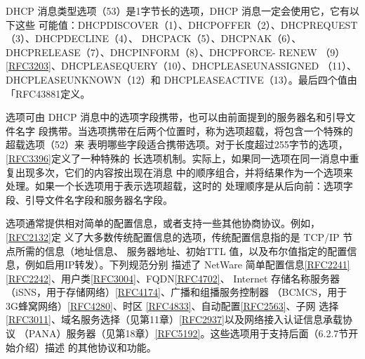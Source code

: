 DHCP 消息类型选项（53）是1字节长的选项，DHCP 消息一定会使用它，它有以下这些
可能值：DHCPDISCOVER（1）、DHCPOFFER（2）、DHCPREQUEST（3）、DHCPDECLINE（4）、
DHCPACK（5）、DHCPNAK（6）、DHCPRELEASE（7）、DHCPINFORM（8）、DHCPFORCE-
RENEW （9）\href{https://www.rfc-editor.org/rfc/rfc3203}{\href{https://www.rfc-editor.org/rfc/rfc3203}{[RFC3203]}}、DHCPLEASEQUERY（10）、DHCPLEASEUNASSIGNED （11）、
DHCPLEASEUNKNOWN（12）和 DHCPLEASEACTIVE（13）。最后四个值由「RFC43881定义。

选项可由 DHCP 消息中的选项字段携带，也可以由前面提到的服务器名和引导文件名字
段携带。当选项携带在后两个位置时，称为选项超载，将包含一个特殊的超载选项（52）来
表明哪些字段适合携带选项。对于长度超过255字节的选项，\href{https://www.rfc-editor.org/rfc/rfc3396}{\href{https://www.rfc-editor.org/rfc/rfc3396}{[RFC3396]}}定义了一种特殊的
长选项机制。实际上，如果同一选项在同一消息中重复出现多次，它们的内容按出现在消息
中的顺序组合，并将结果作为一个选项来处理。如果一个长选项用于表示选项超载，这时的
处理顺序是从后向前：选项字段、引导文件名字段和服务器名字段。

选项通常提供相对简单的配置信息，或者支持一些其他协商协议。例如，\href{https://www.rfc-editor.org/rfc/rfc2132}{\href{https://www.rfc-editor.org/rfc/rfc2132}{[RFC2132]}}定
义了大多数传统配置信息的选项，传统配置信息指的是 TCP/IP 节点所需的信息（地址信息、
服务器地址、初始TTL 值，以及布尔值指定的配置信息，例如启用IP转发）。下列规范分别
描述了 NetWare 简单配置信息\href{https://www.rfc-editor.org/rfc/rfc2241}{\href{https://www.rfc-editor.org/rfc/rfc2241}{[RFC2241]}}\href{https://www.rfc-editor.org/rfc/rfc2242}{\href{https://www.rfc-editor.org/rfc/rfc2242}{[RFC2242]}}、用户类\href{https://www.rfc-editor.org/rfc/rfc3004}{\href{https://www.rfc-editor.org/rfc/rfc3004}{[RFC3004]}}、FQDN\href{https://www.rfc-editor.org/rfc/rfc4702}{\href{https://www.rfc-editor.org/rfc/rfc4702}{[RFC4702]}}、
Internet 存储名称服务器（iSNS，用于存储网络）\href{https://www.rfc-editor.org/rfc/rfc4174}{\href{https://www.rfc-editor.org/rfc/rfc4174}{[RFC4174]}}、广播和组播服务控制器
（BCMCS，用于3G蜂窝网络）\href{https://www.rfc-editor.org/rfc/rfc4280}{\href{https://www.rfc-editor.org/rfc/rfc4280}{[RFC4280]}}、时区 \href{https://www.rfc-editor.org/rfc/rfc4833}{\href{https://www.rfc-editor.org/rfc/rfc4833}{[RFC4833]}}、自动配置\href{https://www.rfc-editor.org/rfc/rfc2563}{\href{https://www.rfc-editor.org/rfc/rfc2563}{[RFC2563]}}、子网
选择\href{https://www.rfc-editor.org/rfc/rfc3011}{\href{https://www.rfc-editor.org/rfc/rfc3011}{[RFC3011]}}、域名服务选择（见第11章）\href{https://www.rfc-editor.org/rfc/rfc2937}{\href{https://www.rfc-editor.org/rfc/rfc2937}{[RFC2937]}}以及网络接入认证信息承载协议
（PANA）服务器（见第18章）\href{https://www.rfc-editor.org/rfc/rfc5192}{\href{https://www.rfc-editor.org/rfc/rfc5192}{[RFC5192]}}。这些选项用于支持后面（6.2.7节开始介绍）描述
的其他协议和功能。

